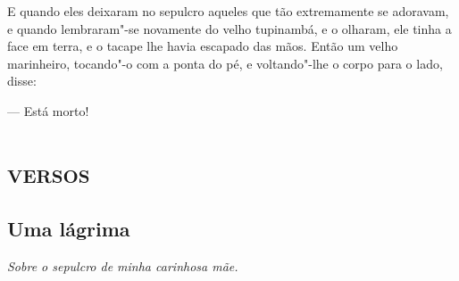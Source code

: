 E quando eles deixaram no sepulcro aqueles que tão extremamente se
adoravam, e quando lembraram"-se novamente do velho tupinambá, e o
olharam, ele tinha a face em terra, e o tacape lhe havia escapado das
mãos. Então um velho marinheiro, tocando"-o com a ponta do pé, e
voltando"-lhe o corpo para o lado, disse:

--- Está morto!

\part{\textsc{versos}}
\pagestyle{plain}

\chapter{Uma lágrima}

\hfill{}\emph{Sobre o sepulcro de minha carinhosa mãe.}

\medskip

